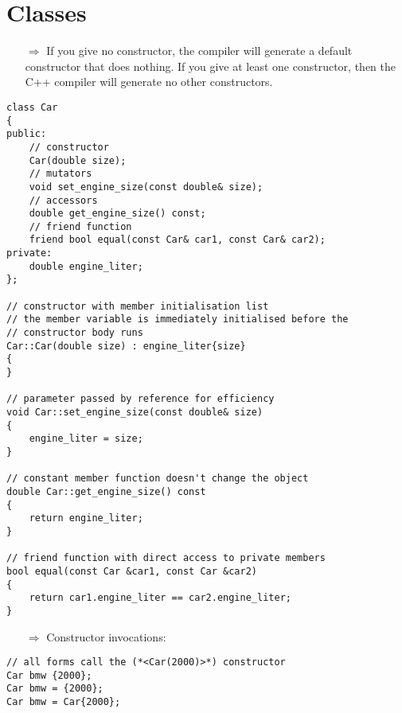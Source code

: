 \documentclass[10pt]{article}
\begin{document}
\section{Classes}
\small
\begin{enumerate}
\item[$\Rightarrow$] If you give no constructor, the compiler will generate a default constructor that does nothing.
If you give at least one constructor, then the C++ compiler will generate no other constructors.
\end{enumerate}
\begin{lstlisting}
class Car
{
public:
    // constructor
    Car(double size);
    // mutators
    void set_engine_size(const double& size);
    // accessors
    double get_engine_size() const;
    // friend function
    friend bool equal(const Car& car1, const Car& car2);
private:	
    double engine_liter;
};

// constructor with member initialisation list
// the member variable is immediately initialised before the
// constructor body runs
Car::Car(double size) : engine_liter{size}
{
}

// parameter passed by reference for efficiency
void Car::set_engine_size(const double& size)
{
    engine_liter = size;
}

// constant member function doesn't change the object
double Car::get_engine_size() const
{
    return engine_liter;
}

// friend function with direct access to private members
bool equal(const Car &car1, const Car &car2)
{
    return car1.engine_liter == car2.engine_liter;
}
\end{lstlisting}
\begin{enumerate}
\item[$\Rightarrow$] Constructor invocations:
\end{enumerate}
\begin{lstlisting}
// all forms call the (*<Car(2000)>*) constructor
Car bmw {2000};
Car bmw = {2000};
Car bmw = Car{2000};
\end{lstlisting}
%
%
\end{document}
